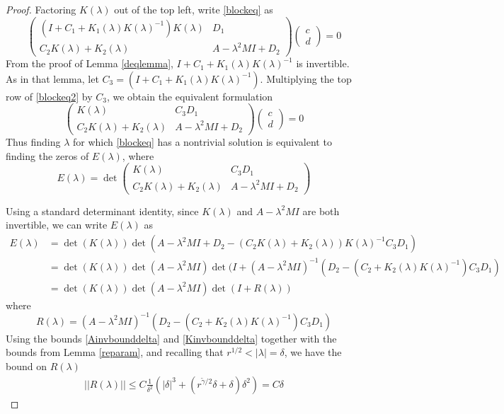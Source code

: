 \documentclass[thesis.tex]{subfiles}
\begin{document}
\begin{lemma}
\begin{proof}
Factoring $K(\lambda)$ out of the top left, write \eqref{blockeq} as
\begin{equation}\label{blockeq2}
\begin{pmatrix}
(I + C_1 + K_1(\lambda)K(\lambda)^{-1})K(\lambda) & D_1 \\
C_2 K(\lambda) + K_2(\lambda) & A - \lambda^2 MI + D_2
\end{pmatrix}
\begin{pmatrix} c \\ d \end{pmatrix} = 0
\end{equation}
From the proof of Lemma \ref{deqlemma}, $I + C_1 + K_1(\lambda)K(\lambda)^{-1}$ is invertible. As in that lemma, let $C_3 = (I + C_1 + K_1(\lambda)K(\lambda)^{-1})$. Multiplying the top row of \eqref{blockeq2} by $C_3$, we obtain the equivalent formulation
\begin{equation}\label{blockeq3}
\begin{pmatrix}
K(\lambda) & C_3 D_1 \\
C_2 K(\lambda) + K_2(\lambda) & A - \lambda^2 MI + D_2
\end{pmatrix}
\begin{pmatrix} c \\ d \end{pmatrix} = 0
\end{equation}
Thus finding $\lambda$ for which \eqref{blockeq} has a nontrivial solution is equivalent to finding the zeros of $E(\lambda)$, where
\begin{equation}
E(\lambda) = \det 
\begin{pmatrix}
K(\lambda) & C_3 D_1 \\
C_2 K(\lambda) + K_2(\lambda) & A - \lambda^2 MI + D_2
\end{pmatrix}
\end{equation}

Using a standard determinant identity, since $K(\lambda)$ and $A - \lambda^2 M I$ are both invertible, we can write $E(\lambda)$ as
\begin{align*}
E(\lambda) &= \det(K(\lambda))
\det ( A - \lambda^2 MI + D_2 - (C_2 K(\lambda) + K_2(\lambda))K(\lambda)^{-1}C_3 D_1 ) \\
&= \det(K(\lambda))\det(A - \lambda^2 MI)
\det ( I + (A - \lambda^2 MI)^{-1}(D_2 - (C_2 + K_2(\lambda)K(\lambda)^{-1})C_3 D_1 ) \\
&= \det(K(\lambda))\det(A - \lambda^2 MI)\det(I + R(\lambda))
\end{align*}
where
\[
R(\lambda) = 
(A - \lambda^2 MI)^{-1}(D_2 - (C_2 + K_2(\lambda)K(\lambda)^{-1})C_3 D_1)
\]
Using the bounds \eqref{Ainvbounddelta} and \eqref{Kinvbounddelta} together with the bounds from Lemma \ref{reparam}, and recalling that $r^{1/2} < |\lambda| = \delta$, we have the bound on $R(\lambda)$
\begin{align*}
||R(\lambda)|| \leq C \frac{1}{\delta^2}
( |\delta|^3 + (r^{\tilde{\gamma}/2}\delta + \delta)\delta^2) = C \delta
\end{align*}


\end{proof}
\end{lemma}
\end{document}
